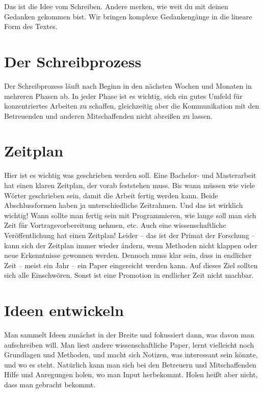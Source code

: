 \documentclass[
  letterpaper,
  DIV=11,
  oneside]{scrreport}
\begin{document}
Das ist die Idee vom Schreiben. Andere merken, wie weit du mit deinen
Gedanken gekommen bist. Wir bringen komplexe Gedankengänge in die
lineare Form des Textes.

\hypertarget{der-schreibprozess}{%
\section{Der Schreibprozess}\label{der-schreibprozess}}

Der Schreibprozess läuft nach Beginn in den nächsten Wochen und Monaten
in mehreren Phasen ab. In jeder Phase ist es wichtig, sich ein gutes
Umfeld für konzentriertes Arbeiten zu schaffen, gleichzeitig aber die
Kommunikation mit den Betreuenden und anderen Mitschaffenden nicht
abreißen zu lassen.

\hypertarget{zeitplan}{%
\section{Zeitplan}\label{zeitplan}}

Hier ist es wichtig was geschrieben werden soll. Eine Bachelor- und
Masterarbeit hat einen klaren Zeitplan, der vorab feststehen muss. Bis
wann müssen wie viele Wörter geschrieben sein, damit die Arbeit fertig
werden kann. Beide Abschlussformen haben ja unterschiedliche Zeitrahmen.
Und das ist wirklich wichtig! Wann sollte man fertig sein mit
Programmieren, wie lange soll man sich Zeit für Vortragsvorbereitung
nehmen, etc. Auch eine wissenschaftliche Veröffentlichung hat einen
Zeitplan! Leider -- das ist der Primat der Forschung -- kann sich der
Zeitplan immer wieder ändern, wenn Methoden nicht klappen oder neue
Erkenntnisse gewonnen werden. Dennoch muss klar sein, dass in endlicher
Zeit -- meist ein Jahr -- ein Paper eingereicht werden kann. Auf dieses
Ziel sollten sich alle Einschwören. Sonst ist eine Promotion in
endlicher Zeit nicht machbar.

\hypertarget{ideen-entwickeln}{%
\section{Ideen entwickeln}\label{ideen-entwickeln}}

Man sammelt Ideen zunächst in der Breite und fokussiert dann, was davon
man aufschreiben will. Man liest andere wissenschaftliche Paper, lernt
vielleicht noch Grundlagen und Methoden, und macht sich Notizen, was
interessant sein könnte, und wo es steht. Natürlich kann man sich bei
den Betreuern und Mitschaffenden Hilfe und Anregungen holen, wo man
Input herbekommt. Holen heißt aber nicht, dass man gebracht bekommt.
\end{document}
